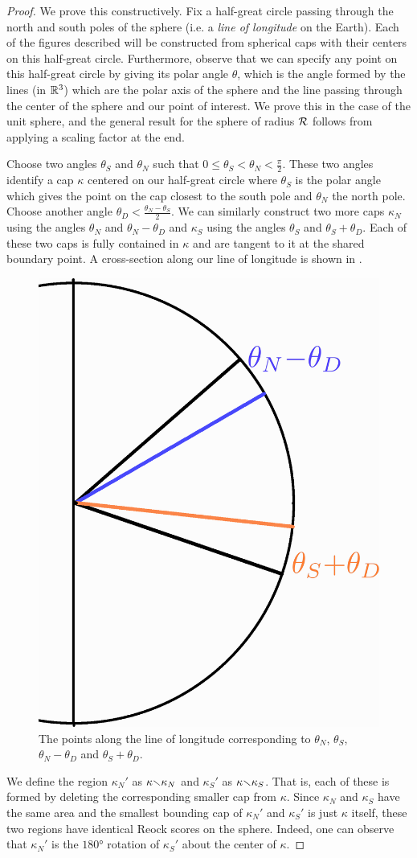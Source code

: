 \begin{proof}


  We prove this constructively.  Fix a half-great circle passing through the north and south poles of the sphere (i.e. a \textit{line of longitude} on the Earth).  Each of the figures described will be constructed from spherical caps with their centers on this half-great circle.  Furthermore, observe that we can specify any point on this half-great circle by giving its polar angle $\theta$, which is the angle formed by the lines (in $\mathbb{R}^3$) which are the polar axis of the sphere and the line passing through the center of the sphere and our point of interest.
  We prove this in the case of the unit sphere, and the general result for the sphere of radius $\mathcal{R}$ follows from applying a scaling factor at the end.
  
  Choose two angles $\theta_S$ and $\theta_N$ such that $0\leq\theta_S<\theta_N<\tfrac{\pi}{2}$.  These two angles identify a cap $\kappa$ centered on our half-great circle where $\theta_S$ is the polar angle which gives the point on the cap closest to the south pole and $\theta_N$ the north pole.  Choose another angle $\theta_D <\tfrac{\theta_N-\theta_S}{2}$.  We can similarly construct two more caps $\kappa_N$ using the angles $\theta_N$ and $\theta_N - \theta_D$ and $\kappa_S$ using the angles $\theta_S$ and $\theta_S+\theta_D$.  Each of these two caps is fully contained in $\kappa$ and are tangent to it at the shared boundary point.  A cross-section along our line of longitude is shown in .
  
  
  \begin{figure}[h]
  	\centering
  	\includegraphics[width=.3\textwidth]{figs/reock_sph_schema.png}
  	\caption{The points along the line of longitude corresponding to $\theta_N$, $\theta_S$, $\theta_N-\theta_D$ and $\theta_S+\theta_D$.}
  	\label{fig:reock_sphere_schema}
  \end{figure}
  
  We define the region $\kappa_N'$ as $\kappa{\smallsetminus}\kappa_N$ and $\kappa_S'$ as $\kappa{\smallsetminus}\kappa_S$.  That is, each of these is formed by deleting the corresponding smaller cap from $\kappa$.  Since $\kappa_N$ and $\kappa_S$ have the same area and the smallest bounding cap of $\kappa_N'$ and $\kappa_S'$ is just $\kappa$ itself, these two regions have identical Reock scores on the sphere.  Indeed, one can observe that $\kappa_N'$ is the $\ang{180}$ rotation of $\kappa_S'$ about the center of $\kappa$.
  

\end{proof}
